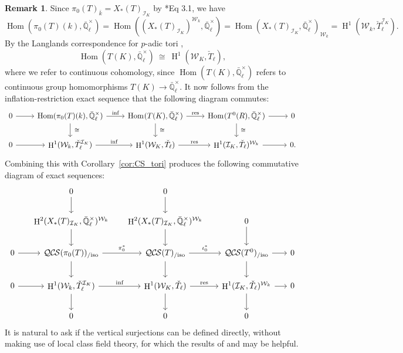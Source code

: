 \documentclass[10pt]{amsart}
\theoremstyle{plain}
\theoremstyle{definition}
\newtheorem{remark}[theorem]{Remark}
\newcommand{\EE}{\mathbb{\bar Q}_\ell}
\newcommand{\bFq}{\bar{k}}
\newcommand{\Fq}{k}
\newcommand{\EEx}{\EE^\times}
\newcommand{\Weil}[1]{\mathcal{W}_{#1}}
\DeclareMathOperator{\Hom}{Hom}
\DeclareMathOperator{\Hh}{H}
\newcommand{\iso}{{\ \cong\ }}
\newcommand{\QCS}{{\mathcal{QC\hskip-0.8pt S}}}
\newcommand{\QCSiso}[1]{\QCS(#1)_{/\text{iso}}}
\begin{document}
\begin{remark}
Since $\pi_0(T)_{\bFq} = X_*(T)_{\mathcal{I}_K}$ by \cite{bitan:discriminant}*{Eq 3.1}, we have
\[\Hom(\pi_0(T)(\Fq), \EEx)
= \Hom((X_*(T)_{\mathcal{I}_K})^{\Weil{\Fq}}, \EEx)
= \Hom(X_*(T)_{\mathcal{I}_K}, \EEx)_{\Weil{\Fq}} 
= \Hh^1(\Weil{\Fq}, \check{T}_\ell^{\mathcal{I}_K}).
\]
By the Langlands correspondence for $p$-adic tori \cite{yu:09a}, 
\[
\Hom(T(K), \EEx) 
\iso 
\Hh^1(\Weil{K}, \check{T}_\ell),
\]
where we refer to continuous cohomology, since $\Hom(T(K), \EEx)$ refers to continuous group homomorphisms $T(K)\to \EEx$.
It now follows from the inflation-restriction exact sequence that the following diagram commutes:
\[
\begin{tikzcd}
   0 \arrow{r} & \Hom(\pi_0(T)(\Fq), \EEx) \arrow{r}{\text{inf}} \arrow{d}{\iso}
    & \arrow{d}{\iso} \Hom_\text{}(T(K),\EEx) \arrow{r}{\text{res}} & \Hom_\text{}(T^0(R),\EEx) \arrow{r} \arrow{d}{\iso} & 0\\    
    0 \arrow{r}  
 & \Hh^1(\Weil{\Fq}, \check{T}_\ell^{\mathcal{I}_K}) \arrow{r}{\text{inf}}
 & \Hh^1(\Weil{K}, \check{T}_\ell) \arrow{r}{\text{res}} 
 & \Hh^1(\mathcal{I}_K, \check{T}_\ell)^{\Weil{\Fq}} \arrow{r}  
 & 0.
\end{tikzcd}
\] 
Combining this with Corollary~\ref{cor:CS_tori}  produces the following commutative diagram of exact sequences:
\begin{equation}\label{eq:GLCT}
  \begin{tikzcd}[row sep=20, column sep=15]
{}  & 0 \arrow{d} & 0 \arrow{d} &  & \\ 
   & \Hh^2(X_*(T)_{\mathcal{I}_K},\EEx)^{\Weil{\Fq}}  \arrow{d} & \arrow{d} \Hh^2(X_*(T)_{\mathcal{I}_K},\EEx)^{\Weil{\Fq}} & 0 \arrow{d} & \\
    0 \rar & \QCSiso{\pi_0(T)} \arrow{r}{\pi_0^*} \arrow{d}
    & \QCSiso{T} \arrow{r}{\iota_0^*}  \arrow{d} & \QCSiso{T^0} \arrow{r} \arrow{d} & 0\\
   0 \arrow{r}  
 & \Hh^1(\Weil{\Fq}, \check{T}_\ell^{\mathcal{I}_K}) \arrow{r}{\text{inf}} \arrow{d}
 & \Hh^1(\Weil{K}, \check{T}_\ell) \arrow{r}{\text{res}} \arrow{d}
 & \Hh^1(\mathcal{I}_K, \check{T}_\ell)^{\Weil{\Fq}} \arrow{r} \arrow{d}  
 & 0\\
 &  0  & 0 & 0 & 
  \end{tikzcd}
 \end{equation}
It is natural to ask if the vertical surjections can be defined directly, without making use of local class field theory,
for which the results of \cite{suzuki-yoshida:12a}  and \cite{suzuki:14a} may be helpful.

\end{remark}
\end{document}
